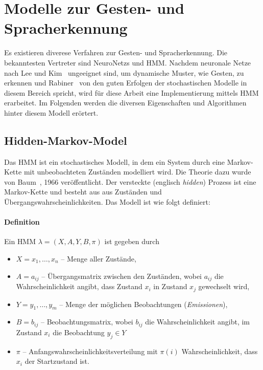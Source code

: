 \chapter{Modelle zur Gesten- und Spracherkennung}
\label{chap:Modelle}
Es existieren diverese Verfahren zur Gesten- und Spracherkennung. Die bekanntesten Vertreter sind \glspl{NeuroNetz} und \gls{HMM}.
Nachdem neuronale Netze nach Lee und Kim~\cite[p.~3]{bib:hmmlee} ungeeignet sind, um dynamische Muster, wie Gesten, zu erkennen und 
Rabiner~\cite[pp.~1]{bib:hmmrabiner} von den guten Erfolgen der stochastischen Modelle in diesem Bereich spricht,
wird f\"ur diese Arbeit eine Implementierung mittels \acrshort{HMM} erarbeitet.
\newline
Im Folgenden werden die diversen Eigenschaften und Algorithmen hinter diesem Modell er\"ortert.
\section{Hidden-Markov-Model}
Das \gls{HMM} ist ein stochastisches Modell, in dem ein System durch eine Markov-Kette mit unbeobachteten Zust\"anden modelliert wird.
Die Theorie dazu wurde von Baum~\cite{bib:hmmbaum}, 1966 ver\"offentlicht.
\newline
Der versteckte (englisch \textit{hidden}) Prozess ist eine Markov-Kette und besteht aus aus Zust\"anden und \"Ubergangswahrscheinlichkeiten.
Das Modell ist wie folgt definiert:

\subsubsection{Definition}
Ein \acrshort{HMM} $\lambda = (X, A, Y, B, \pi)$ ist gegeben durch
\begin{itemize}
  \item $X = {x_1,\ldots,x_n}$ -- Menge aller Zust\"ande,
  \item $A = {a_{ij}}$ -- \"Ubergangsmatrix zwischen den Zust\"anden, wobei $a_{ij}$ die Wahrscheinlichkeit angibt, dass Zustand $x_i$ in Zustand $x_j$ gewechselt wird,
  \item $Y = {y_1,\ldots,y_m}$ -- Menge der m\"oglichen Beobachtungen (\textit{Emissionen}),
  \item $B = {b_{ij}}$ -- Beobachtungsmatrix, wobei $b_{ij}$ die Wahrscheinlichkeit angibt, im Zustand $x_i$ die Beobachtung $y_j \in Y$
  \item $\pi$ -- Anfangswahrscheinlichkeitsverteilung mit $\pi (i)$ Wahrscheinlichkeit, dass $x_i$ der Startzustand ist.
\end{itemize}

